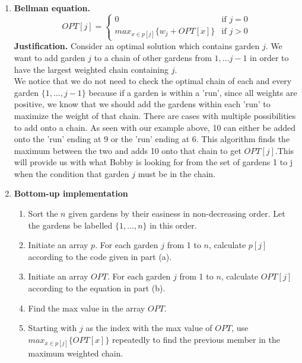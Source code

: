 \documentclass{article}
\begin{document}
\begin{enumerate}
\begin{enumerate}
        \newpage
        \item \textbf{Bellman equation.}
        \[
            OPT[j]=
            \begin{cases}
               0 & \text{if $j=0$}\\
               max_{x \in p[j]}\{w_j + OPT[x]\} & \text{if $j>0$} 
            \end{cases}
        \]
        \textbf{Justification.} Consider an optimal solution which contains garden $j$. We want to add garden $j$ to a chain of other gardens from $1, ... j-1$ in order to have the largest weighted chain containing $j$.\\
        We notice that we do not need to check the optimal chain of each and every garden $\{1, ..., j-1\}$ because if a garden is within a 'run', since all weights are positive, we know that we should add the gardens within each 'run' to maximize the weight of that chain. There are cases with multiple possibilities to add onto a chain. As seen with our example above, 10 can either be added onto the 'run' ending at 9 or the 'run' ending at 6. This algorithm finds the maximum between the two and adds 10 onto that chain to get $OPT[j]$.This will provide us with what Bobby is looking for from the set of gardens 1 to j when the condition that garden $j$ must be in the chain.\\
        
        \item \textbf{Bottom-up implementation}
        \begin{enumerate}
            \item Sort the $n$ given gardens by their easiness in non-decreasing order. Let the gardens be labelled $\{ 1, ..., n\}$ in this order.
            \item Initiate an array $p$. For each garden $j$ from 1 to $n$, calculate $p[j]$ according to the code given in part (a).
            \item Initiate an array $OPT$. For each garden $j$ from 1 to $n$, calculate $OPT[j]$ according to the equation in part (b).
            \item Find the max value in the array $OPT$.
            \item Starting with $j$ as the index with the max value of $OPT$, use $max_{x \in p[j]} \{OPT[x]\}$ repeatedly to find the previous member in the maximum weighted chain.
        \end{enumerate}
        

\end{enumerate}
\end{enumerate}
\end{document}
